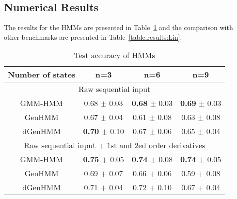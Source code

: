 \subsection{Numerical Results}
The results for the HMMs are presented in Table~\ref{table:results:HMM} and the comparison with other benchmarks are presented in Table~\ref{table:results:Lin}.

\begin{table}[!ht]
\center
\caption{Test accuracy of HMMs}
\setlength{\tabcolsep}{4pt}
\begin{tabular}{cccc}    
\toprule
Number of states 		&  n=3 			    				&  n=6									&  n=9 						\\  
\hline
                                        \multicolumn{4}{c}{Raw sequential input} 		\\
\hline
GMM-HMM				&   0.68 $\pm$ 0.03 		&    \textbf{0.68} $\pm$ 0.03 			&   	\textbf{0.69} $\pm$ 0.03  	\\
GenHMM  				&   0.67 $\pm$ 0.04     	&    0.61 $\pm$ 0.08   		    &   	0.63 $\pm$ 0.08   \\
dGenHMM 				&   \textbf{0.70} $\pm$ 0.10    	&	   0.67 $\pm$ 0.06      	    &  	    0.65 $\pm$ 0.04    \\
   \toprule
                                        \multicolumn{4}{c}{Raw sequential input + $1$st and $2$ed order derivatives}\\
\hline
GMM-HMM				&   \textbf{0.75} $\pm$ 0.05 		&    \textbf{0.74} $\pm$ 0.08			&   	\textbf{0.74} $\pm$ 0.05  	\\
GenHMM  				&   0.69 $\pm$ 0.07    	&    0.66 $\pm$ 0.06  		    &   	0.59 $\pm$ 0.08  \\
dGenHMM 				&  0.71 $\pm$ 0.04    		&	   0.72 $\pm$ 0.10     	    &  	   0.67 $\pm$ 0.04   \\
\bottomrule
\end{tabular}

\label{table:results:HMM}
\end{table}

